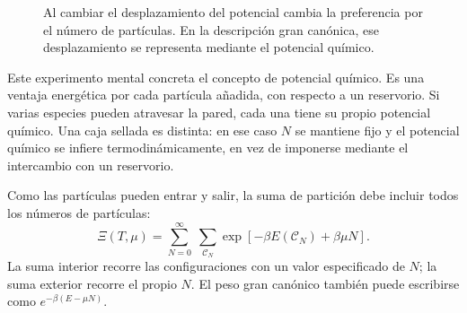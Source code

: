 \begin{figure}[ht]\centering
{}\caption{Al cambiar el desplazamiento del potencial cambia la preferencia por el número de partículas. En la descripción gran canónica, ese desplazamiento se representa mediante el potencial químico.}\end{figure}

Este experimento mental concreta el concepto de potencial químico. Es una ventaja energética por cada partícula añadida, con respecto a un reservorio. Si varias especies pueden atravesar la pared, cada una tiene su propio potencial químico. Una caja sellada es distinta: en ese caso \(N\) se mantiene fijo y el potencial químico se infiere termodinámicamente, en vez de imponerse mediante el intercambio con un reservorio.

\begin{classroomqa}
\end{classroomqa}

Como las partículas pueden entrar y salir, la suma de partición debe incluir todos los números de partículas:
\begin{equation}
\Xi(T,\mu)
=\sum_{N=0}^{\infty}\;\sum_{\mathcal C_N}
\exp\!\left[-\beta E(\mathcal C_N)+\beta\mu N\right].
\label{eq:grand-partition}
\end{equation}
La suma interior recorre las configuraciones con un valor especificado de \(N\); la suma exterior recorre el propio \(N\). El peso gran canónico también puede escribirse como \(e^{-\beta(E-\mu N)}\).

